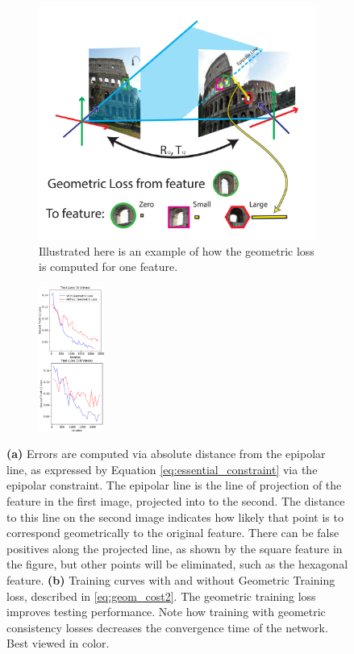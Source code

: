 \documentclass{article} %
\begin{document}
\begin{figure}[t]
\centering
\begin{subfigure}[b]{.60\linewidth}
  \centering
  \includegraphics[width=0.95\linewidth]{figures-GeometricConsistency-v2.pdf}
  \caption{Illustrated here is an example of how the geometric loss is computed for one feature.}
  \label{fig:1b}
  \label{fig:geoconsist}
\end{subfigure}
\begin{subfigure}[b]{.30\textwidth}
  \centering
  \includegraphics[height=180px]{figures-GeometricLoss.pdf}
  \caption{}
  \label{fig:3b}
  \label{fig:geomloss}
\end{subfigure}
\caption{
  \textbf{(a)} Errors are computed via absolute distance from the epipolar line, as expressed by Equation \ref{eq:essential_constraint} via the epipolar constraint.
  The epipolar line is the line of projection of the feature in the first image, projected into to the second.
  The distance to this line on the second image indicates how likely that point is to correspond geometrically to the original feature.
  There can be false positives along the projected line, as shown by the square feature in the figure, but other points will be eliminated, such as the hexagonal feature.
  \textbf{(b)} Training curves with and without Geometric Training loss, described in \ref{eq:geom_cost2}.
  The geometric training loss improves testing performance.
  Note how training with geometric consistency losses decreases the convergence time of the network.
  Best viewed in color.
}
\label{fig:1}
\end{figure}
\end{document}
